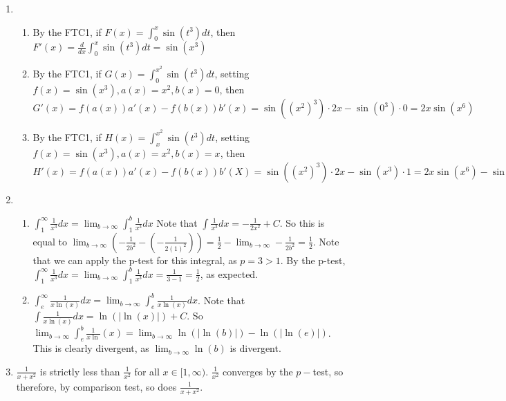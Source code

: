 \documentclass[10pt,english]{article}
\begin{document}
\begin{enumerate}
\item \begin{enumerate}
    \item By the FTC1, if $F(x)=\int_0^x\sin(t^3)dt$, then $F'(x)=\frac{d}{dx}\int_0^x\sin(t^3)dt=\sin(x^3)$
    \item By the FTC1, if $G(x)=\int_0^{x^2}\sin(t^3)dt$, setting $f(x)=\sin(x^3),a(x)=x^2,b(x)=0$, then $G'(x)=f(a(x))a'(x)-f(b(x))b'(x)=\sin((x^2)^3)\cdot2x-\sin(0^3)\cdot0=2x\sin(x^6)$
    \item By the FTC1, if $H(x)=\int_x^{x^2}\sin(t^3)dt$, setting $f(x)=\sin(x^3), a(x)=x^2, b(x)=x$, then $H'(x)=f(a(x))a'(x)-f(b(x))b'(X)=\sin((x^2)^3)\cdot2x-\sin(x^3)\cdot1=2x\sin(x^6)-\sin(x^3)$
\end{enumerate}

\item \begin{enumerate}
    \item $\int_1^\infty\frac{1}{x^3}dx=\lim_{b\rightarrow\infty}\int_1^b\frac{1}{x^3}dx$ Note that $\int\frac{1}{x^3}dx=-\frac{1}{2x^2}+C$. So this is equal to $\lim_{b\rightarrow\infty}\left(-\frac{1}{2b^2}-\left(-\frac{1}{2(1)^2}\right)\right)=\frac{1}{2}-\lim_{b\rightarrow\infty}-\frac{1}{2b^2}=\frac{1}{2}$. Note that we can apply the p-test for this integral, as $p=3>1$. By the p-test, $\int_1^\infty\frac{1}{x^3}dx=\lim_{b\rightarrow\infty}\int_1^b\frac{1}{x^3}dx=\frac{1}{3-1}=\frac{1}{2}$, as expected.
    \item $\int_e^\infty\frac{1}{x\ln(x)}dx=\lim_{b\rightarrow\infty}\int_e^b\frac{1}{x\ln(x)}dx$. Note that $\int\frac{1}{x\ln(x)}dx=\ln(|\ln(x)|)+C$. So $\lim_{b\rightarrow\infty}\int_e^b\frac{1}{x\ln}(x)=\lim_{b\rightarrow\infty}\ln(|\ln(b)|)-\ln(|\ln(e)|)$. This is clearly divergent, as $\lim_{b\rightarrow\infty}\ln(b)$ is divergent. 
\end{enumerate}


\item $\frac{1}{x+x^2}$ is strictly less than $\frac{1}{x^2}$ for all $x\in[1,\infty)$. $\frac{1}{x^2}$ converges by the $p-$test, so therefore, by comparison test, so does $\frac{1}{x+x^2}$. 


\end{enumerate}
\end{document}
